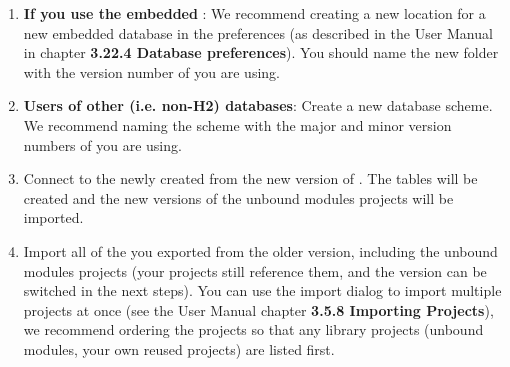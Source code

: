 \begin{enumerate}
\item \textbf{If you use the embedded \gddb{}}: We recommend creating a new location for a new embedded database in the preferences (as described in the User Manual in chapter \textbf{3.22.4 Database preferences}). You should name the new folder with the version number of \app{} you are using. 
\item \textbf{Users of other (i.e. non-H2) databases}: Create a new database scheme. We recommend naming the scheme with the major and minor version numbers of \app{} you are using. 
\item Connect to the newly created \gddb{} from the new version of \app{}. The \gddb{} tables will be created and the new versions of the unbound modules projects will be imported.  
\item Import all of the \gdprojects{} you exported from the older version, including the unbound modules projects (your projects still reference them, and the version can be switched in the next steps). You can use the import dialog to import multiple projects at once (see the User Manual chapter \textbf{3.5.8 Importing Projects}), we recommend ordering the projects so that any library projects (unbound modules, your own reused projects) are listed first.
\end{enumerate}
